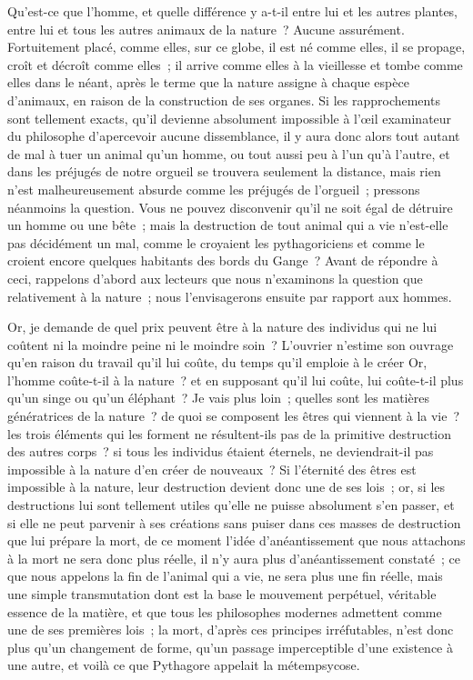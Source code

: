 \documentclass[french,twoside]{book} %
\begin{document}
Qu’est-ce que l’homme, et quelle différence y a-t-il entre lui et les autres plantes, entre lui et tous les autres animaux de la nature ? Aucune assurément. Fortuitement placé, comme elles, sur ce globe, il est né comme elles, il se propage, croît et décroît comme elles ; il arrive comme elles à la vieillesse et tombe comme elles dans le néant, après le terme que la nature assigne à chaque espèce d’animaux, en raison de la construction de ses organes. Si les rapprochements sont tellement exacts, qu’il devienne absolument impossible à l’œil examinateur du philosophe d’apercevoir aucune dissemblance, il y aura donc alors tout autant de mal à tuer un animal qu’un homme, ou tout aussi peu à l’un qu’à l’autre, et dans les préjugés de notre orgueil se trouvera seulement la distance, mais rien n’est malheureusement absurde comme les préjugés de l’orgueil ; pressons néanmoins la question. Vous ne pouvez disconvenir qu’il ne soit égal de détruire un homme ou une bête ; mais la destruction de tout animal qui a vie n’est-elle pas décidément un mal, comme le croyaient les pythagoriciens et comme le croient encore quelques habitants des bords du Gange ? Avant de répondre à ceci, rappelons d’abord aux lecteurs que nous n’examinons la question que relativement à la nature ; nous l’envisagerons ensuite par rapport aux hommes.\par
Or, je demande de quel prix peuvent être à la nature des individus qui ne lui coûtent ni la moindre peine ni le moindre soin ? L’ouvrier n’estime son ouvrage qu’en raison du travail qu’il lui coûte, du temps qu’il emploie à le créer Or, l’homme coûte-t-il à la nature ? et en supposant qu’il lui coûte, lui coûte-t-il plus qu’un singe ou qu’un éléphant ? Je vais plus loin ; quelles sont les matières génératrices de la nature ? de quoi se composent les êtres qui viennent à la vie ? les trois éléments qui les forment ne résultent-ils pas de la primitive destruction des autres corps ? si tous les individus étaient éternels, ne deviendrait-il pas impossible à la nature d’en créer de nouveaux ? Si l’éternité des êtres est impossible à la nature, leur destruction devient donc une de ses lois ; or, si les destructions lui sont tellement utiles qu’elle ne puisse absolument s’en passer, et si elle ne peut parvenir à ses créations sans puiser dans ces masses de destruction que lui prépare la mort, de ce moment l’idée d’anéantissement que nous attachons à la mort ne sera donc plus réelle, il n’y aura plus d’anéantissement constaté ; ce que nous appelons la fin de l’animal qui a vie, ne sera plus une fin réelle, mais une simple transmutation dont est la base le mouvement perpétuel, véritable essence de la matière, et que tous les philosophes modernes admettent comme une de ses premières lois ; la mort, d’après ces principes irréfutables, n’est donc plus qu’un changement de forme, qu’un passage imperceptible d’une existence à une autre, et voilà ce que Pythagore appelait la métempsycose.\par
\end{document}

